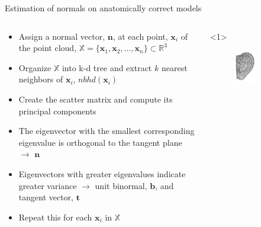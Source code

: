 \documentclass[xcolor=dvipsnames,10pt]{beamer}
\begin{document}
\begin{frame}{Estimation of normals on anatomically correct models}
    \begin{columns}[c]
        \begin{column}{0.5\textwidth}
             \begin{itemize}
                \item<1> Assign a normal vector, $\mathbf{n}$, at each point, $\mathbf{x}_i$ of the point cloud, $\mathbb{X}=\{ \mathbf{x}_1, \mathbf{x}_2, \dots, \mathbf{x}_n \} \subset \mathbb{R}^3$
                \item<2,3> Organize $\mathbb{X}$ into k-d tree and extract $k$ nearest neighbors of $\mathbf{x}_i$, $nbhd ( \mathbf{x}_i )$
                \item<4> Create the scatter matrix and compute its principal components
                \item<5> The eigenvector with the smallest corresponding eigenvalue is orthogonal to the tangent plane $\rightarrow$ $\mathbf{n}$
                \item<6> Eigenvectors with greater eigenvalues indicate greater variance $\rightarrow$ unit binormal, $\mathbf{b}$, and tangent vector, $\mathbf{t}$
                \item<7> Repeat this for each $\mathbf{x}_i$ in $\mathbb{X}$
            \end{itemize}
        \end{column} 
        \begin{column}{0.5\textwidth}
            \begin{onlyenv}<1>
                \begin{center}
                \begin{figure}
                    \includegraphics[width=0.5\textwidth]{artwork/ear_pcd.pdf}

\end{figure}
\end{center}
\end{onlyenv}
\end{column}
\end{columns}
\end{frame}
\end{document}
